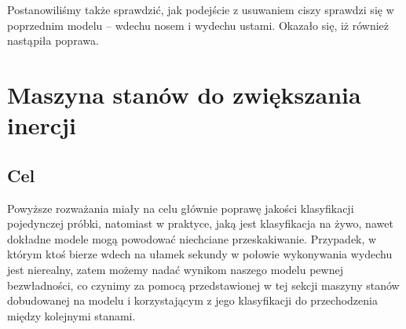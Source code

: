 \documentclass[polish]{article}
\begin{document}
Postanowiliśmy także sprawdzić, jak podejście z usuwaniem ciszy sprawdzi się w poprzednim modelu -- wdechu nosem i wydechu ustami. Okazało się, iż również nastąpiła poprawa.

\section{Maszyna stanów do zwiększania inercji}
\subsection{Cel}
Powyższe rozważania miały na celu głównie poprawę jakości klasyfikacji pojedynczej próbki, natomiast w praktyce, jaką jest klasyfikacja na żywo, nawet dokładne modele mogą powodować niechciane przeskakiwanie.
Przypadek, w którym ktoś bierze wdech na ułamek sekundy w połowie wykonywania wydechu jest nierealny, zatem możemy nadać wynikom naszego modelu pewnej bezwładności, co czynimy za pomocą przedstawionej
w tej sekcji maszyny stanów dobudowanej na modelu i korzystającym z jego klasyfikacji do przechodzenia między kolejnymi stanami.
\end{document}
